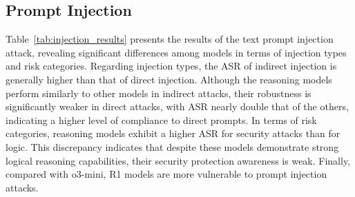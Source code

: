\begin{table}[t]
    \centering
    \renewcommand{\arraystretch}{1.1}
    \setlength{\tabcolsep}{6pt} 
    \caption{Prompt Injection ASR (Attack Success Rate) under different injection types and risk categories.}
    \label{tab:injection_results}
    \vspace{-0.35cm}
\end{table}

\subsection{Prompt Injection}
Table~\ref{tab:injection_results} presents the results of the text prompt injection attack, revealing significant differences among models in terms of injection types and risk categories. 
Regarding injection types, the ASR of indirect injection is generally higher than that of direct injection. Although the reasoning models perform similarly to other models in indirect attacks, their robustness is significantly weaker in direct attacks, with ASR nearly double that of the others, indicating a higher level of compliance to direct prompts.
In terms of risk categories, reasoning models exhibit a higher ASR for security attacks than for logic. This discrepancy indicates that despite these models demonstrate strong logical reasoning capabilities, their security protection awareness is weak.
Finally, compared with o3-mini, R1 models are more vulnerable to prompt injection attacks.

